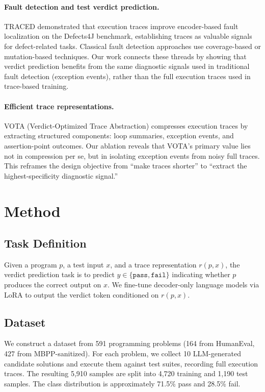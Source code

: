 \documentclass[11pt,a4paper]{article}
\begin{document}
\paragraph{Fault detection and test verdict prediction.}
TRACED \cite{traced2024} demonstrated that execution traces improve encoder-based fault localization on the Defects4J benchmark, establishing traces as valuable signals for defect-related tasks. Classical fault detection approaches use coverage-based or mutation-based techniques. Our work connects these threads by showing that verdict prediction benefits from the same diagnostic signals used in traditional fault detection (exception events), rather than the full execution traces used in trace-based training.

\paragraph{Efficient trace representations.}
VOTA (Verdict-Optimized Trace Abstraction) compresses execution traces by extracting structured components: loop summaries, exception events, and assertion-point outcomes. Our ablation reveals that VOTA's primary value lies not in compression per se, but in isolating exception events from noisy full traces. This reframes the design objective from ``make traces shorter'' to ``extract the highest-specificity diagnostic signal.''

\section{Method}

\subsection{Task Definition}

Given a program $p$, a test input $x$, and a trace representation $r(p, x)$, the verdict prediction task is to predict $y \in \{\texttt{pass}, \texttt{fail}\}$ indicating whether $p$ produces the correct output on $x$. We fine-tune decoder-only language models via LoRA \cite{hu2022lora} to output the verdict token conditioned on $r(p, x)$.

\subsection{Dataset}

We construct a dataset from 591 programming problems (164 from HumanEval, 427 from MBPP-sanitized). For each problem, we collect 10 LLM-generated candidate solutions and execute them against test suites, recording full execution traces. The resulting 5,910 samples are split into 4,720 training and 1,190 test samples. The class distribution is approximately 71.5\% pass and 28.5\% fail.
\end{document}
